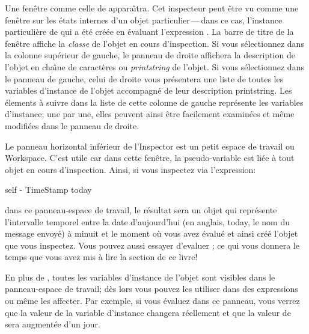 \documentclass[a4paper,10pt,twoside]{book}
\begin{document}
Une fen\^etre comme celle de  appara\^{\i}tra.
Cet inspecteur peut \^etre vu comme une fen\^etre sur les \'etats internes
d'un objet particulier\,---\,dans ce cas, l'instance particuli\`ere
de
 \mbox{} 
qui a \'et\'e cr\'e\'ee en \'evaluant l'expression 
.
La barre de titre de la fen\^etre affiche la \emph{classe} de l'objet
en cours d'inspection.
Si vous s\'electionnez  dans la colonne sup\'erieur de gauche,
le panneau de droite affichera la description de l'objet en cha\^{\i}ne de caract\`eres ou \emph{printstring} de l'objet.
Si vous s\'electionnez  dans le panneau de gauche,
celui de droite vous pr\'esentera une liste de 
toutes les variables d'instance de l'objet accompagn\'e de leur
description printstring.
Les \'elements \`a suivre dans la liste de cette colonne de gauche
repr\'esente les variables d'instance; une par une, elles peuvent ainsi
\^etre facilement examin\'ees et m\^eme modifi\'ees dans le panneau de droite.


Le panneau horizontal inf\'erieur de l'Inspector est un petit espace de
travail ou Workspace.
C'est utile car dans cette fen\^etre, la pseudo-variable  est
li\'ee
\`a tout objet en cours d'inspection.
Ainsi, si vous inspectez via  l'expression:
\begin{code}{}
self - TimeStamp today
\end{code}
dans ce panneau-espace de travail, le r\'esultat sera un objet 
 qui repr\'esente l'intervalle temporel entre 
la date d'aujourd'hui (en anglais, today, le nom du message envoy\'e) \`a
minuit et le moment o\`u vous avez \'evalu\'e 
et ainsi cr\'e\'e l'objet  que vous inspectez.
Vous pouvez aussi essayer d'evaluer ; 
ce qui vous donnera le temps que vous avez mis \`a lire la section de ce livre!

En plus de , toutes les variables d'instance de l'objet sont
visibles dans le panneau-espace de travail; d\`es lors vous pouvez
les utiliser dans des expressions ou m\^eme les affecter.
Par exemple, si vous \'evaluez  dans ce panneau,
vous verrez que la valeur de la variable d'instance  
changera r\'eellement et que la valeur de  
sera augment\'ee d'un jour.
\end{document}

